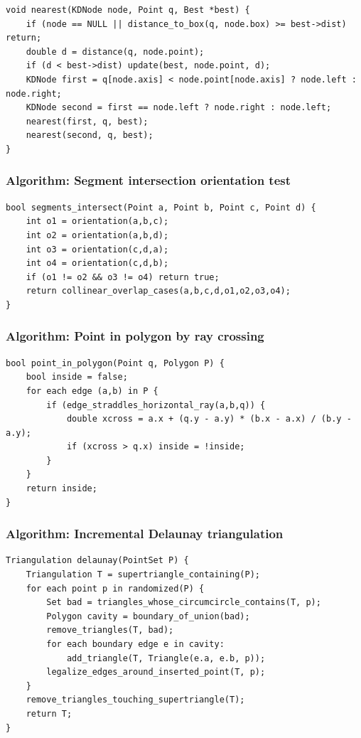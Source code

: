 \documentclass[11pt]{article}
\begin{document}
\begin{verbatim}
void nearest(KDNode node, Point q, Best *best) {
    if (node == NULL || distance_to_box(q, node.box) >= best->dist) return;
    double d = distance(q, node.point);
    if (d < best->dist) update(best, node.point, d);
    KDNode first = q[node.axis] < node.point[node.axis] ? node.left : node.right;
    KDNode second = first == node.left ? node.right : node.left;
    nearest(first, q, best);
    nearest(second, q, best);
}
\end{verbatim}

\subsubsection{Algorithm: Segment intersection orientation test}\label{algorithm-segment-intersection-orientation-test}

\begin{verbatim}
bool segments_intersect(Point a, Point b, Point c, Point d) {
    int o1 = orientation(a,b,c);
    int o2 = orientation(a,b,d);
    int o3 = orientation(c,d,a);
    int o4 = orientation(c,d,b);
    if (o1 != o2 && o3 != o4) return true;
    return collinear_overlap_cases(a,b,c,d,o1,o2,o3,o4);
}
\end{verbatim}

\subsubsection{Algorithm: Point in polygon by ray crossing}\label{algorithm-point-in-polygon-by-ray-crossing}

\begin{verbatim}
bool point_in_polygon(Point q, Polygon P) {
    bool inside = false;
    for each edge (a,b) in P {
        if (edge_straddles_horizontal_ray(a,b,q)) {
            double xcross = a.x + (q.y - a.y) * (b.x - a.x) / (b.y - a.y);
            if (xcross > q.x) inside = !inside;
        }
    }
    return inside;
}
\end{verbatim}

\subsubsection{Algorithm: Incremental Delaunay triangulation}\label{algorithm-incremental-delaunay-triangulation}

\begin{verbatim}
Triangulation delaunay(PointSet P) {
    Triangulation T = supertriangle_containing(P);
    for each point p in randomized(P) {
        Set bad = triangles_whose_circumcircle_contains(T, p);
        Polygon cavity = boundary_of_union(bad);
        remove_triangles(T, bad);
        for each boundary edge e in cavity:
            add_triangle(T, Triangle(e.a, e.b, p));
        legalize_edges_around_inserted_point(T, p);
    }
    remove_triangles_touching_supertriangle(T);
    return T;
}
\end{verbatim}
\end{document}
